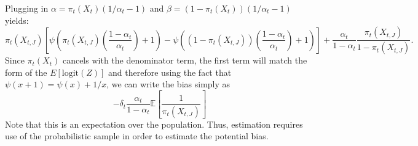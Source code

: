 \documentclass[11pt]{amsart}
\numberwithin{equation}{section}
\theoremstyle{plain}
\def\logit{\text{logit}}
\def\EE{\mathbb{E}}
\begin{document}
Plugging in $\alpha = \pi_t (X_t) (1/\alpha_t -1)$ and $\beta = (1-\pi_t (X_t))(1/\alpha_t - 1)$ yields:
$$
\pi_t (X_{t,J}) \left[ \psi \left(\pi_t (X_{t,J}) \left(\frac{1-\alpha_t}{\alpha_t}\right) + 1\right) - \psi \left((1-\pi_t (X_{t,J})) \left(\frac{1-\alpha_t}{\alpha_t}\right)+1\right) \right] + \frac{\alpha_t}{1-\alpha_t}\frac{\pi_t(X_{t,J})}{1-\pi_t(X_{t,J})}.
$$
Since $\pi_t(X_t)$ cancels with the denominator term, the first term will match the form of the $E[ \logit (Z)]$ and therefore using the fact that $\psi(x+1) = \psi(x) + 1/x$, we can write the bias simply as
$$
-\delta_t \frac{\alpha_t}{1-\alpha_t} \EE \left[ \frac{1}{\pi_t(X_{t,J})} \right]
$$
Note that this is an expectation over the population.  Thus, estimation requires use of the probabilistic sample in order to estimate the potential bias.


\end{document}
